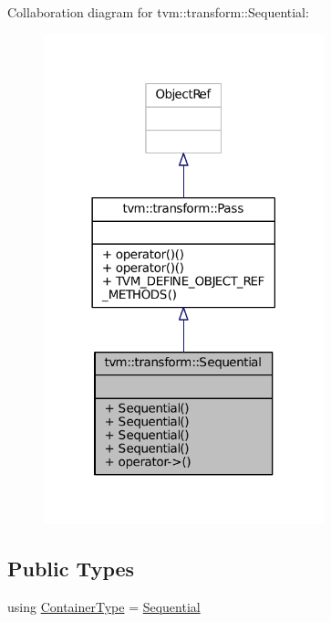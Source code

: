 Collaboration diagram for tvm\+:\+:transform\+:\+:Sequential\+:
\nopagebreak
\begin{figure}[H]
\begin{center}
\leavevmode
\includegraphics[width=230pt]{classtvm_1_1transform_1_1Sequential__coll__graph}
\end{center}
\end{figure}
\subsection*{Public Types}
\begin{DoxyCompactItemize}
\item 
using \hyperlink{classtvm_1_1transform_1_1Sequential_ad1ce40c08602f33656cc82d281f52d9d}{Container\+Type} = \hyperlink{classtvm_1_1transform_1_1Sequential}{Sequential}
\end{DoxyCompactItemize}
